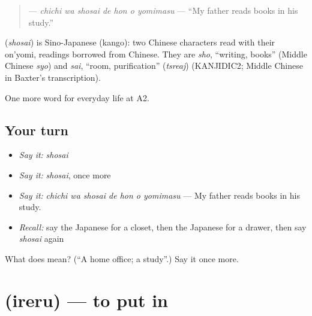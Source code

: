 \begin{quote}
\textbf{   } — \emph{chichi wa shosai de hon o yomimasu} — \textquotedblleft{}My father reads books in his study.\textquotedblright{}
\end{quote}

\begin{cousinweb}
\textbf{} (\emph{shosai}) is Sino-Japanese (kango): two Chinese characters read with their on'yomi, readings borrowed from Chinese. They are \emph{sho}, \textquotedblleft{}writing, books\textquotedblright{} (Middle Chinese \emph{syo}) and \emph{sai}, \textquotedblleft{}room, purification\textquotedblright{} (\emph{tsreaj}) (KANJIDIC2; Middle Chinese in Baxter's transcription).
\end{cousinweb}

\begin{grammarlens}[title={What you've built}]
One more word for everyday life at A2.
\end{grammarlens}

\subsection*{Your turn}
\begin{itemize}
\raggedright
  \item \emph{Say it:} \emph{shosai}
  \item \emph{Say it:} \emph{shosai}, once more
  \item \emph{Say it:} \emph{chichi wa shosai de hon o yomimasu} — My father reads books in his study.
  \item \emph{Recall:} say the Japanese for a closet, then the Japanese for a drawer, then say \emph{shosai} again
\end{itemize}

\begin{tcolorbox}[breakable,colback=teal!4,colframe=teal!35!black,title={Before you move on}]
What does  mean? (\textquotedblleft{}A home office; a study\textquotedblright{}.) Say it once more.
\end{tcolorbox}
\section[\texorpdfstring{\ja{いれる} (ireru)}{いれる (ireru)}]{ (ireru) — to put in}

\label{lesson:JA-C156-ireru}



